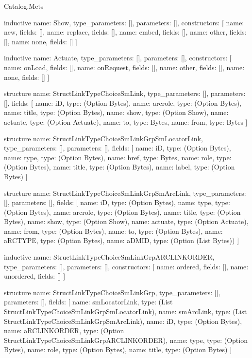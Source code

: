 \begin{lexlean}{Catalog.Mets}
\begin{semanticmodule}
inductive{
  name: Show,
  type_parameters: [],
  parameters: [],
  constructors: [
    {name: new, fields: []},
    {name: replace, fields: []},
    {name: embed, fields: []},
    {name: other, fields: []},
    {name: none, fields: []}
  ]
}

inductive{
  name: Actuate,
  type_parameters: [],
  parameters: [],
  constructors: [
    {name: onLoad, fields: []},
    {name: onRequest, fields: []},
    {name: other, fields: []},
    {name: none, fields: []}
  ]
}

structure{
  name: StructLinkTypeChoiceSmLink,
  type_parameters: [],
  parameters: [],
  fields: [
    {name: iD, type: (Option Bytes)},
    {name: arcrole, type: (Option Bytes)},
    {name: title, type: (Option Bytes)},
    {name: show, type: (Option Show)},
    {name: actuate, type: (Option Actuate)},
    {name: to, type: Bytes},
    {name: from, type: Bytes}
  ]
}

structure{
  name: StructLinkTypeChoiceSmLinkGrpSmLocatorLink,
  type_parameters: [],
  parameters: [],
  fields: [
    {name: iD, type: (Option Bytes)},
    {name: type, type: (Option Bytes)},
    {name: href, type: Bytes},
    {name: role, type: (Option Bytes)},
    {name: title, type: (Option Bytes)},
    {name: label, type: (Option Bytes)}
  ]
}

structure{
  name: StructLinkTypeChoiceSmLinkGrpSmArcLink,
  type_parameters: [],
  parameters: [],
  fields: [
    {name: iD, type: (Option Bytes)},
    {name: type, type: (Option Bytes)},
    {name: arcrole, type: (Option Bytes)},
    {name: title, type: (Option Bytes)},
    {name: show, type: (Option Show)},
    {name: actuate, type: (Option Actuate)},
    {name: from, type: (Option Bytes)},
    {name: to, type: (Option Bytes)},
    {name: aRCTYPE, type: (Option Bytes)},
    {name: aDMID, type: (Option (List Bytes))}
  ]
}

inductive{
  name: StructLinkTypeChoiceSmLinkGrpARCLINKORDER,
  type_parameters: [],
  parameters: [],
  constructors: [
    {name: ordered, fields: []},
    {name: unordered, fields: []}
  ]
}

structure{
  name: StructLinkTypeChoiceSmLinkGrp,
  type_parameters: [],
  parameters: [],
  fields: [
    {name: smLocatorLink, type: (List StructLinkTypeChoiceSmLinkGrpSmLocatorLink)},
    {name: smArcLink, type: (List StructLinkTypeChoiceSmLinkGrpSmArcLink)},
    {name: iD, type: (Option Bytes)},
    {name: aRCLINKORDER, type: (Option StructLinkTypeChoiceSmLinkGrpARCLINKORDER)},
    {name: type, type: (Option Bytes)},
    {name: role, type: (Option Bytes)},
    {name: title, type: (Option Bytes)}
  ]
}


\end{semanticmodule}
\end{lexlean}
